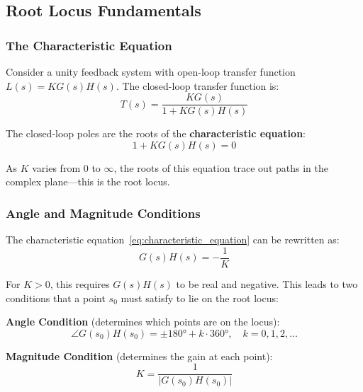 \subsection{Root Locus Fundamentals}
\label{subsec:root_locus_fundamentals}

\subsubsection{The Characteristic Equation}

Consider a unity feedback system with open-loop transfer function $L(s) = K G(s) H(s)$. The closed-loop transfer function is:
\begin{equation}
T(s) = \frac{KG(s)}{1 + KG(s)H(s)}
\end{equation}

The closed-loop poles are the roots of the \textbf{characteristic equation}:
\begin{equation}
1 + KG(s)H(s) = 0
\label{eq:characteristic_equation}
\end{equation}

As $K$ varies from 0 to $\infty$, the roots of this equation trace out paths in the complex plane---this is the root locus.

\subsubsection{Angle and Magnitude Conditions}

The characteristic equation~\eqref{eq:characteristic_equation} can be rewritten as:
\begin{equation}
G(s)H(s) = -\frac{1}{K}
\end{equation}

For $K > 0$, this requires $G(s)H(s)$ to be real and negative. This leads to two conditions that a point $s_0$ must satisfy to lie on the root locus:

\textbf{Angle Condition} (determines which points are on the locus):
\begin{equation}
\boxed{\angle G(s_0)H(s_0) = \pm 180° + k \cdot 360°, \quad k = 0, 1, 2, \ldots}
\label{eq:angle_condition}
\end{equation}

\textbf{Magnitude Condition} (determines the gain at each point):
\begin{equation}
\boxed{K = \frac{1}{|G(s_0)H(s_0)|}}
\label{eq:magnitude_condition}
\end{equation}

